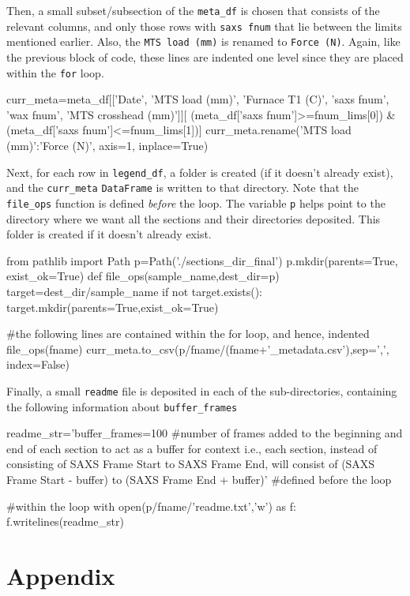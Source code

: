 \documentclass{article}
\begin{document}
Then, a small subset/subsection of the \texttt{meta\_df} is chosen that consists of the relevant columns, and only those rows with \texttt{saxs fnum} that lie between the limits mentioned earlier. Also, the \texttt{MTS load (mm)} is renamed to \texttt{Force (N)}. Again, like the previous block of code, these lines are indented one level since they are placed within the \texttt{for} loop.

\begin{pythoncode}
  curr_meta=meta_df[['Date', 'MTS load (mm)', 'Furnace T1 (C)',
                     'saxs fnum', 'wax fnum', 'MTS crosshead (mm)']][
                     (meta_df['saxs fnum']>=fnum_lims[0]) &
                     (meta_df['saxs fnum']<=fnum_lims[1])]
  curr_meta.rename({'MTS load (mm)':'Force (N)'}, axis=1, inplace=True)
\end{pythoncode}

Next, for each row in \texttt{legend\_df}, a folder is created (if it doesn't already exist), and the \texttt{curr\_meta} \texttt{DataFrame} is written to that directory. Note that the \texttt{file\_ops} function is defined \emph{before} the loop. The variable \texttt{p} helps point to the directory where we want all the sections and their directories deposited. This folder is created if it doesn't already exist.

\begin{pythoncode}
from pathlib import Path
p=Path('./sections_dir_final')
p.mkdir(parents=True, exist_ok=True)
def file_ops(sample_name,dest_dir=p)
    target=dest_dir/sample_name
    if not target.exists():
        target.mkdir(parents=True,exist_ok=True)

#the following lines are contained within the for loop, and hence, indented
  file_ops(fname)
  curr_meta.to_csv(p/fname/(fname+'_metadata.csv'),sep=',', index=False)      
\end{pythoncode}

Finally, a small \texttt{readme} file is deposited in each of the sub-directories, containing the following information about \texttt{buffer\_frames}

\begin{pythoncode}
readme_str='buffer_frames=100 #number of frames added to the beginning and end of each section to act as a buffer for context i.e., each section, instead of consisting of SAXS Frame Start to SAXS Frame End, will consist of (SAXS Frame Start - buffer) to (SAXS Frame End + buffer)' #defined before the loop

#within the loop
  with open(p/fname/'readme.txt','w') as f:
      f.writelines(readme_str)
\end{pythoncode}

\newpage

\section{Appendix}


\end{document}
